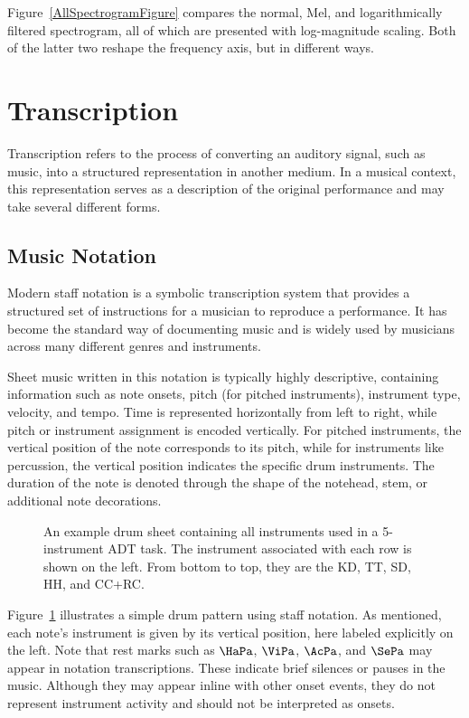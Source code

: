 Figure~\ref{AllSpectrogramFigure} compares the normal, Mel, and logarithmically filtered spectrogram, all of which are presented with log-magnitude scaling. Both of the latter two reshape the frequency axis, but in different ways.

\section{Transcription}

Transcription refers to the process of converting an auditory signal, such as music, into a structured representation in another medium. In a musical context, this representation serves as a description of the original performance and may take several different forms.

\subsection{Music Notation}

Modern staff notation is a symbolic transcription system that provides a structured set of instructions for a musician to reproduce a performance. It has become the standard way of documenting music and is widely used by musicians across many different genres and instruments.

Sheet music written in this notation is typically highly descriptive, containing information such as note onsets, pitch (for pitched instruments), instrument type, velocity, and tempo. Time is represented horizontally from left to right, while pitch or instrument assignment is encoded vertically. For pitched instruments, the vertical position of the note corresponds to its pitch, while for instruments like percussion, the vertical position indicates the specific drum instruments. The duration of the note is denoted through the shape of the notehead, stem, or additional note decorations.

\begin{figure}[H]
    \centering
    
    \caption{An example drum sheet containing all instruments used in a 5-instrument \gls{ADT} task. The instrument associated with each row is shown on the left. From bottom to top, they are the \acrfull{KD}, \acrfull{TT}, \acrfull{SD}, \acrfull{HH}, and \acrfull{CC+RC}.}
    \label{DrumsheetFigure}
\end{figure}

Figure~\ref{DrumsheetFigure} illustrates a simple drum pattern using staff notation. As mentioned, each note's instrument is given by its vertical position, here labeled explicitly on the left. Note that rest marks such as $\HaPa$, $\ViPa$, $\AcPa$, and $\SePa$ may appear in notation transcriptions. These indicate brief silences or pauses in the music. Although they may appear inline with other onset events, they do not represent instrument activity and should not be interpreted as onsets.

